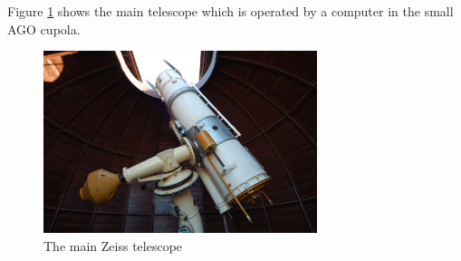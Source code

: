 	Figure \ref{fig:fmpiago2} shows the main telescope which is operated by a computer in the small AGO cupola.

\begin{figure}[H]
\centering
  \includegraphics[width=8cm]{images/FMPIAGO2}
  \caption{The main Zeiss telescope}
  \label{fig:fmpiago2}
\end{figure}